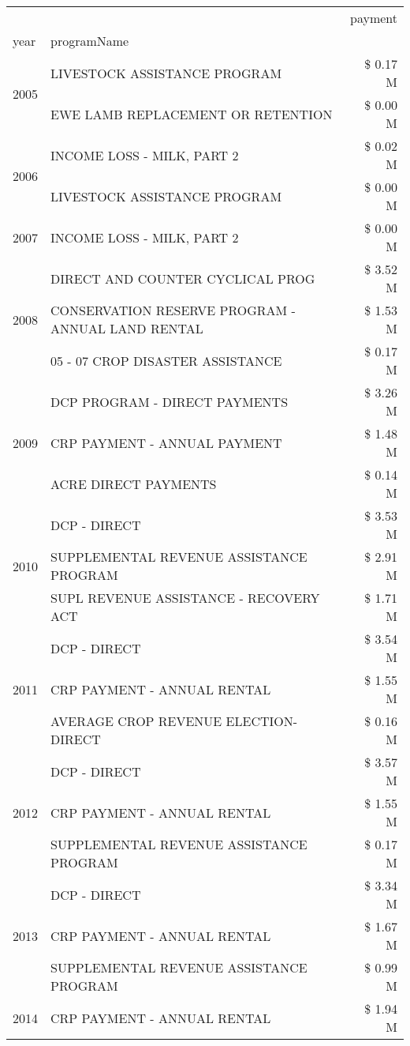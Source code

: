 \begin{tabular}{llr}
\toprule
 &  & payment \\
year & programName &  \\
\midrule
\multirow[t]{2}{*}{2005} & LIVESTOCK ASSISTANCE PROGRAM & \$ 0.17 M \\
 & EWE LAMB REPLACEMENT OR RETENTION & \$ 0.00 M \\
\cline{1-3}
\multirow[t]{2}{*}{2006} & INCOME LOSS - MILK, PART 2 & \$ 0.02 M \\
 & LIVESTOCK ASSISTANCE PROGRAM & \$ 0.00 M \\
\cline{1-3}
2007 & INCOME LOSS - MILK, PART 2 & \$ 0.00 M \\
\cline{1-3}
\multirow[t]{3}{*}{2008} & DIRECT AND COUNTER CYCLICAL PROG & \$ 3.52 M \\
 & CONSERVATION RESERVE PROGRAM - ANNUAL LAND RENTAL & \$ 1.53 M \\
 & 05 - 07 CROP DISASTER ASSISTANCE & \$ 0.17 M \\
\cline{1-3}
\multirow[t]{3}{*}{2009} & DCP PROGRAM - DIRECT PAYMENTS & \$ 3.26 M \\
 & CRP PAYMENT - ANNUAL PAYMENT & \$ 1.48 M \\
 & ACRE DIRECT PAYMENTS & \$ 0.14 M \\
\cline{1-3}
\multirow[t]{3}{*}{2010} & DCP - DIRECT & \$ 3.53 M \\
 & SUPPLEMENTAL REVENUE ASSISTANCE PROGRAM & \$ 2.91 M \\
 & SUPL REVENUE ASSISTANCE - RECOVERY ACT & \$ 1.71 M \\
\cline{1-3}
\multirow[t]{3}{*}{2011} & DCP - DIRECT & \$ 3.54 M \\
 & CRP PAYMENT - ANNUAL RENTAL & \$ 1.55 M \\
 & AVERAGE CROP REVENUE ELECTION-DIRECT & \$ 0.16 M \\
\cline{1-3}
\multirow[t]{3}{*}{2012} & DCP - DIRECT & \$ 3.57 M \\
 & CRP PAYMENT - ANNUAL RENTAL & \$ 1.55 M \\
 & SUPPLEMENTAL REVENUE ASSISTANCE PROGRAM & \$ 0.17 M \\
\cline{1-3}
\multirow[t]{3}{*}{2013} & DCP - DIRECT & \$ 3.34 M \\
 & CRP PAYMENT - ANNUAL RENTAL & \$ 1.67 M \\
 & SUPPLEMENTAL REVENUE ASSISTANCE PROGRAM & \$ 0.99 M \\
\cline{1-3}
\multirow[t]{3}{*}{2014} & CRP PAYMENT - ANNUAL RENTAL & \$ 1.94 M \\

\end{tabular}
